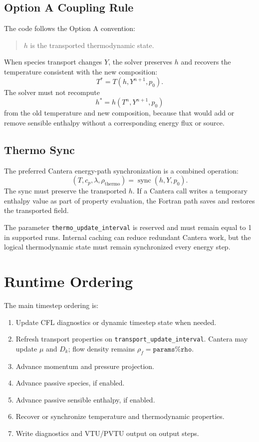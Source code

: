 \documentclass[11pt]{article}
\begin{document}
\subsection{Option A Coupling Rule}

The code follows the Option A convention:
\begin{quote}
  \(h\) is the transported thermodynamic state.
\end{quote}
When species transport changes \(Y\), the solver preserves \(h\) and recovers
the temperature consistent with the new composition:
\begin{equation}
  T^{*} = T(h,Y^{n+1},p_0).
\end{equation}
The solver must not recompute
\begin{equation}
  h^{*} = h(T^n,Y^{n+1},p_0)
\end{equation}
from the old temperature and new composition, because that would add or remove
sensible enthalpy without a corresponding energy flux or source.

\subsection{Thermo Sync}

The preferred Cantera energy-path synchronization is a combined operation:
\begin{equation}
  (T,c_p,\lambda,\rho_{\mathrm{thermo}})
  =
  \operatorname{sync}(h,Y,p_0).
\end{equation}
The sync must preserve the transported \(h\).  If a Cantera call writes a
temporary enthalpy value as part of property evaluation, the Fortran path saves
and restores the transported field.

The parameter \texttt{thermo\_update\_interval} is reserved and must remain
equal to 1 in supported runs.  Internal caching can reduce redundant Cantera
work, but the logical thermodynamic state must remain synchronized every energy
step.

\section{Runtime Ordering}

The main timestep ordering is:
\begin{enumerate}[leftmargin=*]
  \item Update CFL diagnostics or dynamic timestep state when needed.
  \item Refresh transport properties on \texttt{transport\_update\_interval}.
        Cantera may update \(\mu\) and \(D_k\); flow density remains
        \(\rho_f=\texttt{params\%rho}\).
  \item Advance momentum and pressure projection.
  \item Advance passive species, if enabled.
  \item Advance passive sensible enthalpy, if enabled.
  \item Recover or synchronize temperature and thermodynamic properties.
  \item Write diagnostics and VTU/PVTU output on output steps.
\end{enumerate}
\end{document}
